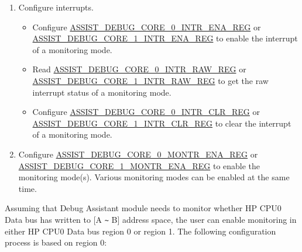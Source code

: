 \documentclass[main\_\_EN.tex]{subfiles}
\begin{document}
\begin{enumerate}
    \item Configure interrupts.
    \begin{itemize}
        \item Configure \hyperref[regdesc:ASSISTDEBUGCORE0INTRENAREG]{ASSIST\_DEBUG\_CORE\_0\_INTR\_ENA\_REG} or \hyperref[regdesc:ASSISTDEBUGCORE1INTRENAREG]{ASSIST\_DEBUG\_CORE\_1\_INTR\_ENA\_REG} to enable the interrupt of a monitoring mode.
        \item Read \hyperref[regdesc:ASSISTDEBUGCORE0INTRRAWREG]{ASSIST\_DEBUG\_CORE\_0\_INTR\_RAW\_REG} or \hyperref[regdesc:ASSISTDEBUGCORE1INTRRAWREG]{ASSIST\_DEBUG\_CORE\_1\_INTR\_RAW\_REG} to get the raw interrupt status of a monitoring mode.
        \item Configure \hyperref[regdesc:ASSISTDEBUGCORE0INTRCLRREG]{ASSIST\_DEBUG\_CORE\_0\_INTR\_CLR\_REG} or \hyperref[regdesc:ASSISTDEBUGCORE1INTRCLRREG]{ASSIST\_DEBUG\_CORE\_1\_INTR\_CLR\_REG} to clear the interrupt of a monitoring mode.
    \end{itemize}
    \item Configure \hyperref[regdesc:ASSISTDEBUGCORE0MONTRENAREG]{ASSIST\_DEBUG\_CORE\_0\_MONTR\_ENA\_REG} or \hyperref[regdesc:ASSISTDEBUGCORE1MONTRENAREG]{ASSIST\_DEBUG\_CORE\_1\_MONTR\_ENA\_REG} to enable the monitoring mode(s). Various monitoring modes can be enabled at the same time.
\end{enumerate}

Assuming that Debug Assistant module needs to monitor whether HP CPU0 Data bus has written to [A \verb+~+ B] address space, the user can enable monitoring in either HP CPU0 Data bus region 0 or region 1. The following configuration process is based on region 0:
\end{document}
